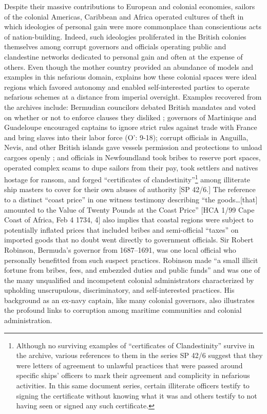 Despite their massive contributions to European and colonial economies, sailors of the colonial Americas, Caribbean and Africa operated cultures of theft in which ideologies of personal gain were more commonplace than conscientious acts of nation-building. Indeed, such ideologies proliferated in the British colonies themselves among corrupt governors and officials operating public and clandestine networks dedicated to personal gain and often at the expense of others. Even though the mother country provided an abundance of models and examples in this nefarious domain, \citet{Fusaro2015} explains how these colonial spaces were ideal regions which favored autonomy and enabled self-interested parties to operate nefarious schemes at a distance from imperial oversight. Examples recovered from the archives include: Bermudian councilors debated British mandates and voted on whether or not to enforce clauses they disliked \citep[55]{Jarvis2010}; governors of Martinique and Guadeloupe encouraged captains to ignore strict rules against trade with France and bring slaves into their labor force (O’\citealt{Malley2016}: 9-18); corrupt officials in Anguilla, Nevis, and other British islands gave vessels permission and protections to unload  cargoes openly \citep[173]{Jarvis2010}; and officials in Newfoundland took bribes to reserve port spaces, operated complex scams to dupe sailors from their pay, took settlers and natives hostage for ransom, and forged “certificates of clandestinity”\footnote{Although no surviving examples of “certificates of Clandestinity” survive in the archive, various references to them in the series SP 42/6 suggest that they were letters of agreement to unlawful practices that were passed around specific ships’ officers to mark their agreement and complicity in nefarious activities. In this same document series, certain illiterate officers testify to signing the certificate without knowing what it was and others testify to not having seen or signed any such certificate.}  among illiterate ship masters to cover for their own abuses of authority [SP 42/6.] The reference to a distinct “coast price” in one witness testimony describing “the goods…[that] amounted to the Value of Twenty Pounds at the Coast Price” [HCA 1/99 Cape Coast of Africa, Feb 4 1734, 4] also implies that coastal regions were subject to potentially inflated prices that included bribes and semi-official “taxes” on imported goods that no doubt went directly to government officials. Sir Robert Robinson, Bermuda’s governor from 1687--1691, was one local official who personally benefitted from such suspect practices. Robinson made “a small illicit fortune from bribes, fees, and embezzled duties and public funds” \citep[70]{Jarvis2010} and was one of the many unqualified and incompetent colonial administrators characterized by upholding unscrupulous, discriminatory, and self-interested practices. His background as an ex-navy captain, like many colonial governors, also illustrates the profound links to corruption among maritime communities and colonial administration.

